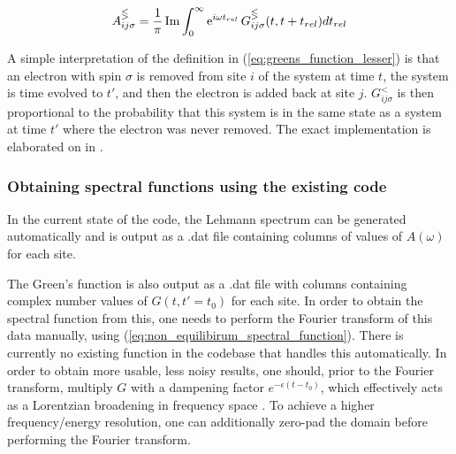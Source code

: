 \begin{equation}
    A_{ij\sigma}^\gtlt = \frac{1}{\pi} \operatorname{Im}\int_0^\infty \operatorname{e}^{i\omega t_{rel}} G_{ij\sigma}^\gtlt (t,t+t_{rel}) dt_{rel}\label{eq:non_equilibirum_spectral_function}
\end{equation}

A simple interpretation of the definition in (\ref{eq:greens_function_lesser}) is that an electron with spin $\sigma$ is removed from site $i$ of the system at time $t$, the system is time evolved to $t'$, and then the electron is added back at site $j$. $G_{ij\sigma}^{<}$ is then proportional to the probability that this system is in the same state as a system at time $t'$ where the electron was never removed. The exact implementation is elaborated on in \cite{worm_bachelor}. 

\subsubsection{Obtaining spectral functions using the existing code}

In the current state of the code, the Lehmann spectrum can be generated automatically and is output as a .dat file containing columns of values of $A(\omega)$ for each site.

\bigskip
The Green's function is also output as a .dat file with columns containing complex number values of $G(t,t'=t_0)$ for each site. In order to obtain the spectral function from this, one needs to perform the Fourier transform of this data manually, using (\ref{eq:non_equilibirum_spectral_function}). There is currently no existing function in the codebase that handles this automatically. In order to obtain more usable, less noisy results, one should, prior to the Fourier transform, multiply $G$ with a dampening factor $e^{-\epsilon (t-t_0)}$, which effectively acts as a Lorentzian broadening in frequency space \cite{spectral_function}. To achieve a higher frequency/energy resolution, one can additionally zero-pad the domain before performing the Fourier transform. 